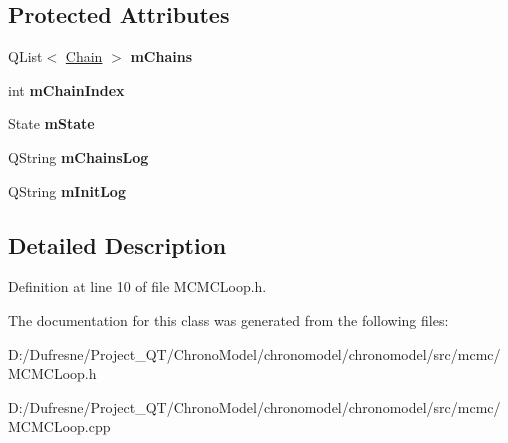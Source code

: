 \subsection*{Protected Attributes}
\begin{DoxyCompactItemize}
\item 
\hypertarget{class_m_c_m_c_loop_a74395cee92e542eceec38d17398b192c}{Q\-List$<$ \hyperlink{struct_chain}{Chain} $>$ {\bfseries m\-Chains}}\label{class_m_c_m_c_loop_a74395cee92e542eceec38d17398b192c}

\item 
\hypertarget{class_m_c_m_c_loop_aef82872438332bf6816ccd1b8d65a03c}{int {\bfseries m\-Chain\-Index}}\label{class_m_c_m_c_loop_aef82872438332bf6816ccd1b8d65a03c}

\item 
\hypertarget{class_m_c_m_c_loop_a6ee56ea4f14a04e9372663c136d4ba39}{State {\bfseries m\-State}}\label{class_m_c_m_c_loop_a6ee56ea4f14a04e9372663c136d4ba39}

\item 
\hypertarget{class_m_c_m_c_loop_a873d8e6708ab37d733166f010151487a}{Q\-String {\bfseries m\-Chains\-Log}}\label{class_m_c_m_c_loop_a873d8e6708ab37d733166f010151487a}

\item 
\hypertarget{class_m_c_m_c_loop_a1d9ce0616b5e6caf501d6f9f9af4763f}{Q\-String {\bfseries m\-Init\-Log}}\label{class_m_c_m_c_loop_a1d9ce0616b5e6caf501d6f9f9af4763f}

\end{DoxyCompactItemize}


\subsection{Detailed Description}


Definition at line 10 of file M\-C\-M\-C\-Loop.\-h.



The documentation for this class was generated from the following files\-:\begin{DoxyCompactItemize}
\item 
D\-:/\-Dufresne/\-Project\-\_\-\-Q\-T/\-Chrono\-Model/chronomodel/chronomodel/src/mcmc/M\-C\-M\-C\-Loop.\-h\item 
D\-:/\-Dufresne/\-Project\-\_\-\-Q\-T/\-Chrono\-Model/chronomodel/chronomodel/src/mcmc/M\-C\-M\-C\-Loop.\-cpp\end{DoxyCompactItemize}
